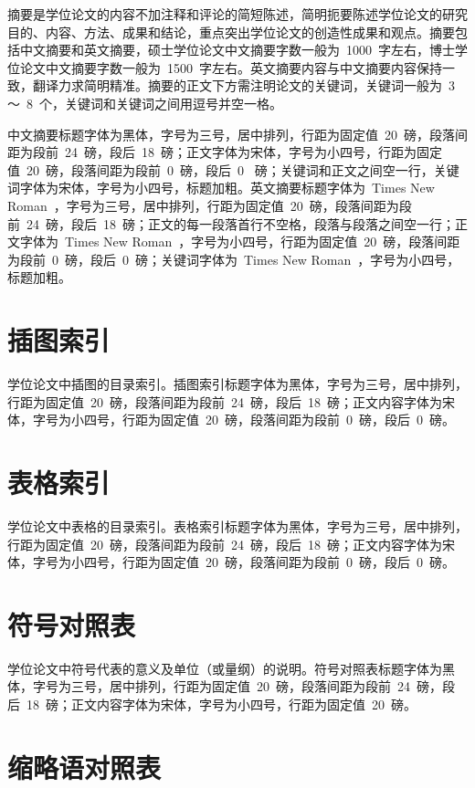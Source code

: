 摘要是学位论文的内容不加注释和评论的简短陈述，简明扼要陈述学位论文的研究目的、内容、方法、成果和结论，重点突出学位论文的创造性成果和观点。摘要包括中文摘要和英文摘要，硕士学位论文中文摘要字数一般为~1000~字左右，博士学位论文中文摘要字数一般为~1500~字左右。英文摘要内容与中文摘要内容保持一致，翻译力求简明精准。摘要的正文下方需注明论文的关键词，关键词一般为~3~ ～~8~个，关键词和关键词之间用逗号并空一格。

中文摘要标题字体为黑体，字号为三号，居中排列，行距为固定值~20~磅，段落间距为段前~24~磅，段后~18~磅；正文字体为宋体，字号为小四号，行距为固定值~20~磅，段落间距为段前~0~磅，段后~0~ 磅；关键词和正文之间空一行，关键词字体为宋体，字号为小四号，标题加粗。英文摘要标题字体为~Times New Roman~，字号为三号，居中排列，行距为固定值~20~磅，段落间距为段前~24~磅，段后~18~磅；正文的每一段落首行不空格，段落与段落之间空一行；正文字体为~Times New Roman~，字号为小四号，行距为固定值~20~磅，段落间距为段前~0~磅，段后~0~磅；关键词字体为~Times New Roman~，字号为小四号，标题加粗。

\section{插图索引}

学位论文中插图的目录索引。插图索引标题字体为黑体，字号为三号，居中排列，行距为固定值~20~磅，段落间距为段前~24~磅，段后~18~磅；正文内容字体为宋体，字号为小四号，行距为固定值~20~磅，段落间距为段前~0~磅，段后~0~磅。

\section{表格索引}

学位论文中表格的目录索引。表格索引标题字体为黑体，字号为三号，居中排列，行距为固定值~20~磅，段落间距为段前~24~磅，段后~18~磅；正文内容字体为宋体，字号为小四号，行距为固定值~20~磅，段落间距为段前~0~磅，段后~0~磅。

\section{符号对照表}

学位论文中符号代表的意义及单位（或量纲）的说明。符号对照表标题字体为黑体，字号为三号，居中排列，行距为固定值~20~磅，段落间距为段前~24~磅，段后~18~磅；正文内容字体为宋体，字号为小四号，行距为固定值~20~磅。

\section{缩略语对照表}

